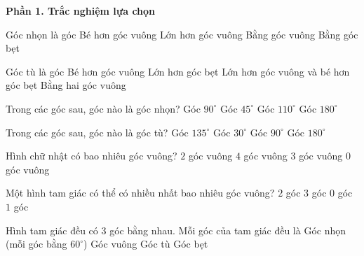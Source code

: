 \textbf{Phần 1. Trắc nghiệm lựa chọn}

\begin{ex} %
Góc nhọn là góc
\choice
{\True Bé hơn góc vuông}
{Lớn hơn góc vuông}
{Bằng góc vuông}
{Bằng góc bẹt}
\end{ex}

\begin{ex} %
Góc tù là góc
\choice
{Bé hơn góc vuông}
{Lớn hơn góc bẹt}
{\True Lớn hơn góc vuông và bé hơn góc bẹt}
{Bằng hai góc vuông}
\end{ex}

\begin{ex} %
Trong các góc sau, góc nào là góc nhọn?
\choice
{Góc $90^\circ$}
{\True Góc $45^\circ$}
{Góc $110^\circ$}
{Góc $180^\circ$}
\end{ex}

\begin{ex} %
Trong các góc sau, góc nào là góc tù?
\choice
{\True Góc $135^\circ$}
{Góc $30^\circ$}
{Góc $90^\circ$}
{Góc $180^\circ$}
\end{ex}

\begin{ex} %
Hình chữ nhật có bao nhiêu góc vuông?
\choice
{$2$ góc vuông}
{\True $4$ góc vuông}
{$3$ góc vuông}
{$0$ góc vuông}
\end{ex}

\begin{ex} %
Một hình tam giác có thể có nhiều nhất bao nhiêu góc vuông?
\choice
{$2$ góc}
{$3$ góc}
{$0$ góc}
{\True $1$ góc}
\end{ex}

\begin{ex} %
Hình tam giác đều có 3 góc bằng nhau. Mỗi góc của tam giác đều là
\choice
{\True Góc nhọn (mỗi góc bằng $60^\circ$)}
{Góc vuông}
{Góc tù}
{Góc bẹt}
\end{ex}

